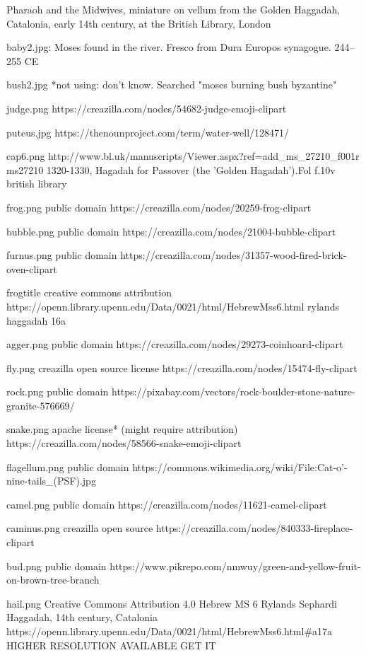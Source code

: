 Pharaoh and the Midwives, miniature on vellum from the Golden Haggadah, Catalonia, early 14th century, at the British Library, London

baby2.jpg:
Moses found in the river. Fresco from Dura Europos synagogue.
244–255 CE

bush2.jpg *not using:
don't know.  Searched "moses burning bush byzantine"

judge.png
https://creazilla.com/nodes/54682-judge-emoji-clipart

puteus.jpg
https://thenounproject.com/term/water-well/128471/

cap6.png
http://www.bl.uk/manuscripts/Viewer.aspx?ref=add_ms_27210_f001r
ms27210 1320-1330, Hagadah for Passover (the 'Golden Hagadah').Fol f.10v
british library 

frog.png
public domain
https://creazilla.com/nodes/20259-frog-clipart

bubble.png
public domain
https://creazilla.com/nodes/21004-bubble-clipart

furnus.png
public domain
https://creazilla.com/nodes/31357-wood-fired-brick-oven-clipart

frogtitle
creative commons attribution
https://openn.library.upenn.edu/Data/0021/html/HebrewMss6.html
rylands haggadah 16a

agger.png
public domain
https://creazilla.com/nodes/29273-coinhoard-clipart

fly.png
creazilla open source license
https://creazilla.com/nodes/15474-fly-clipart

rock.png
public domain
https://pixabay.com/vectors/rock-boulder-stone-nature-granite-576669/

snake.png
apache license* (might require attribution)
https://creazilla.com/nodes/58566-snake-emoji-clipart

flagellum.png
public domain
https://commons.wikimedia.org/wiki/File:Cat-o'-nine-tails_(PSF).jpg

camel.png
public domain
https://creazilla.com/nodes/11621-camel-clipart

caminus.png
creazilla open source
https://creazilla.com/nodes/840333-fireplace-clipart

bud.png
public domain
https://www.pikrepo.com/nmwuy/green-and-yellow-fruit-on-brown-tree-branch

hail.png
Creative Commons Attribution 4.0
Hebrew MS 6 Rylands Sephardi Haggadah, 14th century, Catalonia
https://openn.library.upenn.edu/Data/0021/html/HebrewMss6.html#a17a
HIGHER RESOLUTION AVAILABLE GET IT

